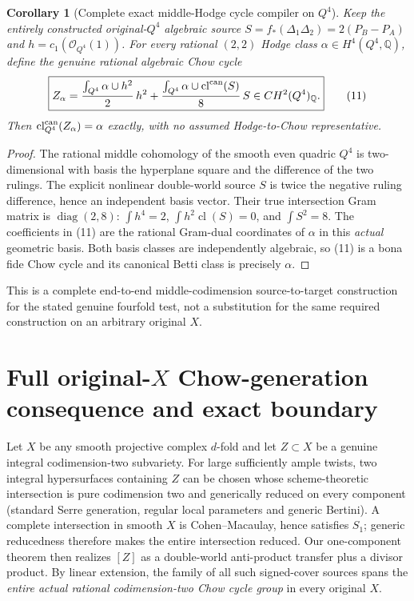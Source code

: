 \documentclass[11pt]{article}
\newtheorem{corollary}{Corollary}
\begin{document}
\begin{corollary}[Complete exact middle-Hodge cycle compiler on $Q^4$]
Keep the entirely constructed original-$Q^4$ algebraic
source $S=f_*(\Delta_1\Delta_2)=2(P_B-P_A)$ and
$h=c_1(\mathcal O_{Q^4}(1))$. For \emph{every}
rational $(2,2)$ Hodge class
$\alpha\in H^4(Q^4,\mathbb Q)$, define the genuine rational
algebraic Chow cycle
\[
 \boxed{
 Z_\alpha=
 \frac{\int_{Q^4}\alpha\cup h^2}{2}\,h^2+
 \frac{\int_{Q^4}\alpha\cup\operatorname{cl}^{\rm can}(S)}{8}\,S
 \in CH^2(Q^4)_{\mathbb Q}.
 }                                                          \tag{11}
\]
Then $\operatorname{cl}^{\rm can}_{Q^4}(Z_\alpha)=\alpha$
exactly, with \emph{no} assumed Hodge-to-Chow representative.
\end{corollary}
\begin{proof}
The rational middle cohomology of the smooth even quadric
$Q^4$ is two-dimensional with basis the hyperplane square
and the difference of the two rulings. The explicit
nonlinear double-world source $S$ is twice the negative
ruling difference, hence an independent basis vector.
Their true intersection Gram matrix is
$\operatorname{diag}(2,8)$: $\int h^4=2$,
$\int h^2\operatorname{cl}(S)=0$, and $\int S^2=8$.
The coefficients in (11) are the rational Gram-dual
coordinates of $\alpha$ in this \emph{actual} geometric
basis. Both basis classes are independently algebraic,
so (11) is a bona fide Chow cycle and its canonical Betti
class is precisely $\alpha$.
\end{proof}
This is a complete end-to-end middle-codimension
source-to-target construction for the stated genuine
fourfold test, not a substitution for the same required
construction on an arbitrary original $X$.

\section{Full original-$X$ Chow-generation consequence and exact boundary}
Let $X$ be any smooth projective complex $d$-fold and
let $Z\subset X$ be a genuine integral codimension-two
subvariety. For large sufficiently ample twists, two
integral hypersurfaces containing $Z$ can be chosen whose
scheme-theoretic intersection is pure codimension two
and generically reduced on every component (standard
Serre generation, regular local parameters and generic
Bertini). A complete intersection in smooth $X$ is
Cohen--Macaulay, hence satisfies $S_1$; generic reducedness
therefore makes the entire intersection reduced. Our
one-component theorem then realizes $[Z]$ as a
double-world anti-product transfer plus a divisor product.
By linear extension, the family of all such signed-cover
sources spans the \emph{entire actual rational codimension-two
Chow cycle group} in every original $X$.
\end{document}
